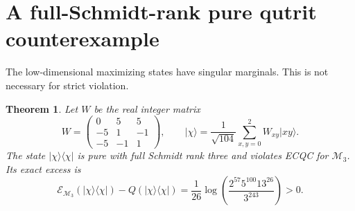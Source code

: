 \documentclass[11pt]{article}
\newtheorem{theorem}{Theorem}[section]
\theoremstyle{remark}
\newcommand{\E}{\mathcal E}
\newcommand{\M}{\mathcal M}
\newcommand{\ket}[1]{\lvert #1\rangle}
\newcommand{\bra}[1]{\langle #1\rvert}
\begin{document}
\section{A full-Schmidt-rank pure qutrit counterexample}\label{sec:full}
The low-dimensional maximizing states have singular marginals. This is not necessary for strict violation.

\begin{theorem}\label{thm:fullqutrit}
Let $W$ be the real integer matrix
\begin{equation}\label{eq:Wfull}
 W=\begin{pmatrix}0&5&5\\-5&1&-1\\-5&-1&1\end{pmatrix},\qquad
 \ket\chi=\frac1{\sqrt{104}}\sum_{x,y=0}^2W_{xy}\ket{xy}.
\end{equation}
The state $\ket\chi\bra\chi$ is pure with full Schmidt rank three and violates ECQC for $\M_3$. Its exact excess is
\begin{equation}\label{eq:fullgap}
 \E_{\M_3}(\ket\chi\bra\chi)-Q(\ket\chi\bra\chi)
 =\frac1{26}\log\!\left(\frac{2^{57}5^{100}13^{26}}{3^{243}}\right)>0.
\end{equation}
\end{theorem}
\end{document}

